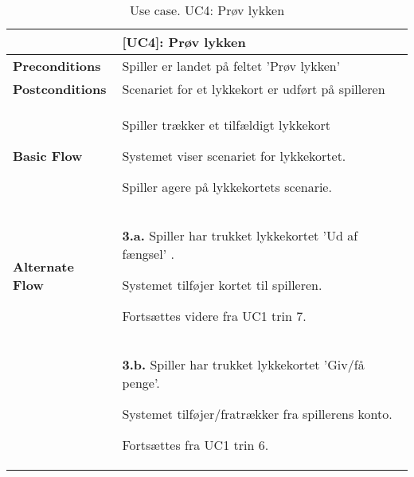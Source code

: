 \documentclass[class=article, crop=false]{standalone}
\begin{document}
    \begin{table}[H]
        \caption{Use case. UC4: Prøv lykken}
        \begin{tabularx}{\textwidth}{|l|X|}
            \hline
            & \textbf{[UC4]: Prøv lykken}   \\ \hline
            \textbf{Preconditions}       & Spiller er landet på feltet 'Prøv lykken'\\ \hline
            \textbf{Postconditions}      & Scenariet for et lykkekort er udført på spilleren\\ \hline


            \textbf{Basic Flow} & \begin{tabenum}
                                      \item Spiller trækker et tilfældigt lykkekort
                                      \item Systemet viser scenariet for lykkekortet.
                                      \item Spiller agere på lykkekortets scenarie.
            \end{tabenum}   \\ \hline




            \textbf{Alternate Flow}   & \textbf{3.a.} Spiller har trukket lykkekortet 'Ud af fængsel' .
            \begin{enumerate} \begin{tabenum}
                                  \item Systemet tilføjer kortet til spilleren.
                                  \item Fortsættes videre fra UC1 trin 7.
            \end{tabenum} \end{enumerate}
            \\


                               & \textbf{3.b.} Spiller har trukket lykkekortet 'Giv/få penge'.
            \begin{enumerate} \begin{tabenum}
                                  \item Systemet tilføjer/fratrækker fra spillerens konto.
                                  \item Fortsættes fra UC1 trin 6.
            \end{tabenum} \end{enumerate}
            \\


\end{tabularx}
\end{table}
\end{document}
